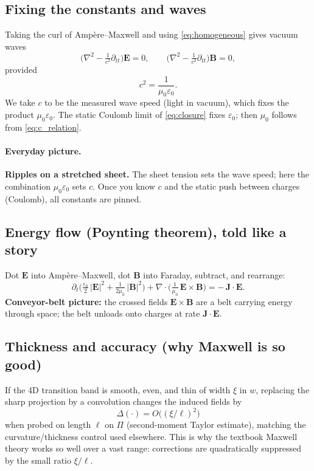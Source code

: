 \subsection{Fixing the constants and waves}
Taking the curl of Amp\`ere–Maxwell and using \eqref{eq:homogeneous} gives vacuum waves
\[
\big(\nabla^2 - \tfrac{1}{c^2}\partial_{tt}\big)\mathbf E=0,
\qquad
\big(\nabla^2 - \tfrac{1}{c^2}\partial_{tt}\big)\mathbf B=0,
\]
provided
\begin{equation}
c^2=\frac{1}{\mu_0\varepsilon_0}.
\label{eq:c_relation}
\end{equation}
We take $c$ to be the measured wave speed (light in vacuum), which fixes the product $\mu_0\varepsilon_0$. The static Coulomb limit of \eqref{eq:closure} fixes $\varepsilon_0$; then $\mu_0$ follows from \eqref{eq:c_relation}.

\paragraph{Everyday picture.} 
\textbf{Ripples on a stretched sheet.} The sheet tension sets the wave speed; here the combination $\mu_0\varepsilon_0$ sets $c$. Once you know $c$ and the static push between charges (Coulomb), all constants are pinned.

\subsection{Energy flow (Poynting theorem), told like a story}
Dot $\mathbf E$ into Amp\`ere–Maxwell, dot $\mathbf B$ into Faraday, subtract, and rearrange:
\[
\partial_t \Big(\tfrac{\varepsilon_0}{2}\,|\mathbf E|^2 + \tfrac{1}{2\mu_0}\,|\mathbf B|^2\Big)
+ \nabla\!\cdot\!\Big(\tfrac{1}{\mu_0}\,\mathbf E\times \mathbf B\Big)
= -\,\mathbf J\!\cdot\!\mathbf E.
\]
\textbf{Conveyor-belt picture:} the crossed fields $\mathbf E\times\mathbf B$ are a belt carrying energy through space; the belt unloads onto charges at rate $\mathbf J\!\cdot\!\mathbf E$.

\subsection{Thickness and accuracy (why Maxwell is so good)}
If the 4D transition band is smooth, even, and thin of width $\xi$ in $w$, replacing the sharp projection by a convolution changes the induced fields by
\[
\Delta(\cdot)=O\!\big((\xi/\ell)^2\big)
\]
when probed on length $\ell$ on $\Pi$ (second-moment Taylor estimate), matching the curvature/thickness control used elsewhere. This is why the textbook Maxwell theory works so well over a vast range: corrections are quadratically suppressed by the small ratio $\xi/\ell$.

